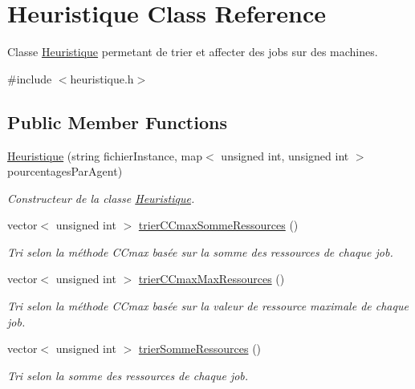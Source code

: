 \hypertarget{classHeuristique}{}\section{Heuristique Class Reference}
\label{classHeuristique}


Classe \hyperlink{classHeuristique}{Heuristique} permetant de trier et affecter des jobs sur des machines.  




{\ttfamily \#include $<$heuristique.\+h$>$}

\subsection*{Public Member Functions}
\begin{DoxyCompactItemize}
\item 
\hyperlink{classHeuristique_a6d5f8c9f55e42a8713c8a5636d9cef1b}{Heuristique} (string fichier\+Instance, map$<$ unsigned int, unsigned int $>$ pourcentages\+Par\+Agent)
\begin{DoxyCompactList}\small\item\em Constructeur de la classe \hyperlink{classHeuristique}{Heuristique}. \end{DoxyCompactList}\item 
vector$<$ unsigned int $>$ \hyperlink{classHeuristique_a38c390423fc2b190da599148ca879cd6}{trier\+C\+Cmax\+Somme\+Ressources} ()
\begin{DoxyCompactList}\small\item\em Tri selon la méthode C\+Cmax basée sur la somme des ressources de chaque job. \end{DoxyCompactList}\item 
vector$<$ unsigned int $>$ \hyperlink{classHeuristique_a02aae5127f941e55311e8bbd3b4afd3c}{trier\+C\+Cmax\+Max\+Ressources} ()
\begin{DoxyCompactList}\small\item\em Tri selon la méthode C\+Cmax basée sur la valeur de ressource maximale de chaque job. \end{DoxyCompactList}\item 
vector$<$ unsigned int $>$ \hyperlink{classHeuristique_a6101d6d238a7667b820b50629e4d497f}{trier\+Somme\+Ressources} ()
\begin{DoxyCompactList}\small\item\em Tri selon la somme des ressources de chaque job. \end{DoxyCompactList}\item 

\end{DoxyCompactItemize}
